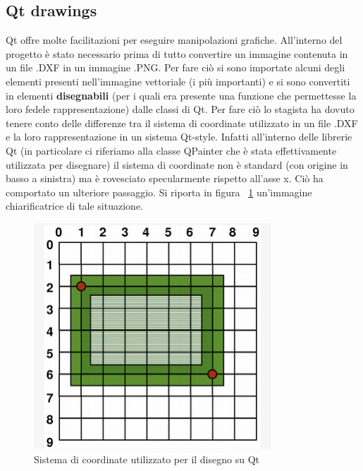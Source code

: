 \subsection{Qt drawings}
Qt offre molte facilitazioni per eseguire manipolazioni grafiche. All'interno del progetto è stato necessario prima di tutto convertire un immagine contenuta in un file .DXF in un immagine .PNG. Per fare ciò si sono importate alcuni degli elementi presenti nell'immagine vettoriale (i più importanti) e si sono convertiti in elementi \textbf{disegnabili} (per i quali era presente una funzione che permettesse la loro fedele rappresentazione) dalle classi di Qt. Per fare ciò lo stagista ha dovuto tenere conto delle differenze tra il sistema di coordinate utilizzato in un file .DXF e la loro rappresentazione in un sistema Qt-style. Infatti all'interno delle librerie Qt (in particolare ci riferiamo alla classe QPainter che è stata effettivamente utilizzata per disegnare) il sistema di coordinate non è standard (con origine in basso a sinistra) ma è rovesciato specularmente rispetto all'asse x. Ciò ha comportato un ulteriore passaggio. Si riporta in figura ~\ref {fig:qtgrad1} un'immagine chiarificatrice di tale situazione.


\begin{figure}[htpb] 
\centering 
\includegraphics[scale=0.5]{./images/qtgrad1.png} 
\caption{Sistema di coordinate utilizzato per il disegno su Qt} 
\label{fig:qtgrad1}
\end{figure} 

